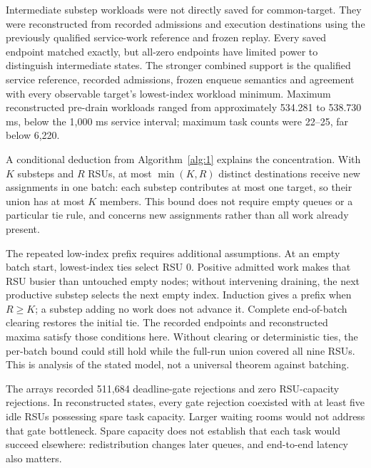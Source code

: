 \documentclass[11pt,a4paper]{article}
\begin{document}
Intermediate substep workloads were not directly saved for common-target. They were reconstructed from recorded admissions and execution destinations using the previously qualified service-work reference and frozen replay. Every saved endpoint matched exactly, but all-zero endpoints have limited power to distinguish intermediate states. The stronger combined support is the qualified service reference, recorded admissions, frozen enqueue semantics and agreement with every observable target's lowest-index workload minimum. Maximum reconstructed pre-drain workloads ranged from approximately 534.281 to 538.730 ms, below the 1,000 ms service interval; maximum task counts were 22--25, far below 6,220.

A conditional deduction from Algorithm~\ref{alg:1} explains the concentration. With $K$ substeps and $R$ RSUs, at most $\min(K,R)$ distinct destinations receive new assignments in one batch: each substep contributes at most one target, so their union has at most $K$ members. This bound does not require empty queues or a particular tie rule, and concerns new assignments rather than all work already present.

The repeated low-index prefix requires additional assumptions. At an empty batch start, lowest-index ties select RSU 0. Positive admitted work makes that RSU busier than untouched empty nodes; without intervening draining, the next productive substep selects the next empty index. Induction gives a prefix when $R\geq K$; a substep adding no work does not advance it. Complete end-of-batch clearing restores the initial tie. The recorded endpoints and reconstructed maxima satisfy those conditions here. Without clearing or deterministic ties, the per-batch bound could still hold while the full-run union covered all nine RSUs. This is analysis of the stated model, not a universal theorem against batching.

The arrays recorded 511,684 deadline-gate rejections and zero RSU-capacity rejections. In reconstructed states, every gate rejection coexisted with at least five idle RSUs possessing spare task capacity. Larger waiting rooms would not address that gate bottleneck. Spare capacity does not establish that each task would succeed elsewhere: redistribution changes later queues, and end-to-end latency also matters.
\end{document}
